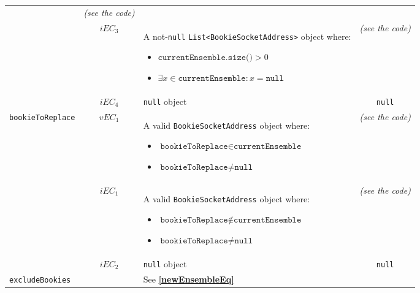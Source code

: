 \documentclass[sigconf]{acmart}
\begin{document}
\begin{table*}
\begin{tabular}{l|cm{10.5cm}|c}
& \textit{(see the code)}

\\\cline{2-4}   

& $iEC_3$ & A not-\texttt{null} \texttt{List<BookieSocketAddress>} object where:
\begin{itemize}
\item $\texttt{currentEnsemble.size()} > 0$
\item $\exists x \in \texttt{currentEnsemble} : x = \texttt{null}$
\end{itemize}

& \textit{(see the code)}

\\\cline{2-4}   

& $iEC_4$ & \texttt{null} object & \texttt{null}

\\\hline

\texttt{bookieToReplace} & $vEC_1$ & A valid \texttt{BookieSocketAddress} object where:
\begin{itemize}
\item $\texttt{bookieToReplace} \in \texttt{currentEnsemble}$
\item $\texttt{bookieToReplace} \neq \texttt{null}$
\end{itemize}

& \textit{(see the code)}

\\\cline{2-4}   

& $iEC_1$ & A valid \texttt{BookieSocketAddress} object where:
\begin{itemize}
\item $\texttt{bookieToReplace} \notin \texttt{currentEnsemble}$
\item $\texttt{bookieToReplace} \neq \texttt{null}$
\end{itemize}

& \textit{(see the code)}

\\\cline{2-4}   

& $iEC_2$ & \texttt{null} object & \texttt{null}

\\\hline

\texttt{excludeBookies} & & See \textbf{\cref{newEnsembleEq}} &

\\

\bottomrule
\end{tabular}
\end{table*}
\end{document}
